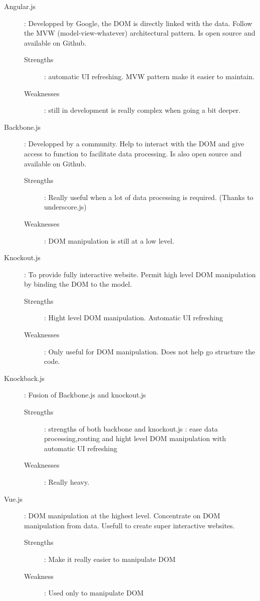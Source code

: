 \documentclass[12pt]{report}%
\begin{document}
\begin{description}
	\item[Angular.js] : Developped by Google, the DOM is directly linked with the data. Follow the MVW (model-view-whatever) architectural pattern. Is open source and available on Github. \begin{description}
		\item[Strengths] : automatic UI refreshing. MVW pattern make it easier to maintain.
		\item[Weaknesses] : still in development is really complex when going a bit deeper.
	\end{description}
	\item[Backbone.js] : Developped by a community. Help to interact with the DOM and give access to function to facilitate data processing. Is also open source and available on Github. \begin{description}
		\item[Strengths] : Really useful when a lot of data processing is required. (Thanks to underscore.js)
		\item[Weaknesses] : DOM manipulation is still at a low level.
	\end{description}
	\item[Knockout.js] : To provide fully interactive website. Permit high level DOM manipulation by binding the DOM to the model. \begin{description}
	\item[Strengths] : Hight level DOM manipulation. Automatic UI refreshing
	\item[Weaknesses] : Only useful for DOM manipulation. Does not help go structure the code. 
	\end{description}
	\item[Knockback.js] : Fusion of Backbone.js and knockout.js \begin{description}
		\item[Strengths] : strengths of both backbone and knockout.js : ease data processing,routing and hight level DOM manipulation with automatic UI refreshing
		\item[Weaknesses] : Really heavy.
	\end{description}
	\item[Vue.js] : DOM manipulation at the highest level. Concentrate on DOM manipulation from data. Usefull to create super interactive websites. \begin{description}
		\item[Strengths] : Make it really easier to manipulate DOM
		\item[Weakness] : Used only to manipulate DOM
	\end{description}
\end{description}
\end{document}

